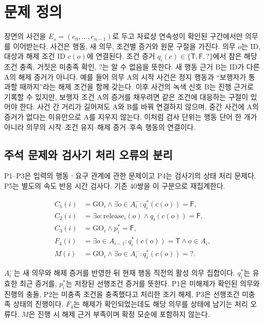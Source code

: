 \section{문제 정의}
\label{sec:problem}

\begin{revision}

장면의 사건을 $E_s=(e_0,\ldots,e_{n-1})$로 두고 자료상 연속성이 확인된 구간에서만 의무를 이어받는다. 사건은 행동, 새 의무, 조건별 증거와 원문 구절을 가진다. 의무 $o$는 ID, 대상과 해제 조건 ID $c(o)$에 연결된다. 조건 증거 $q_i(c)\in\{\mathsf{T},\mathsf{F},?\}$에서 참은 해당 조건 충족, 거짓은 미충족 확인, $?$는 알 수 없음을 뜻한다. 새 행동 근거 B는 ID가 다른 A의 해제 증거가 아니다.
예를 들어 의무 A의 시작 사건은 정지 행동과 ``보행자가 통과할 때까지''라는 해제 조건을 함께 갖는다. 이후 사건의 녹색 신호 B는 진행 근거로 기록할 수 있지만, 보행자 조건 A의 증거를 채우려면 같은 조건에 대응하는 구절이 있어야 한다. 사건 간 거리가 길어져도 A와 B를 바꿔 연결하지 않으며, 중간 사건에 A의 증거가 없다는 이유만으로 A를 지우지 않는다. 이처럼 검사 단위는 행동 단어 한 개가 아니라 의무의 시작--조건 유지--해제 증거--후속 행동의 연결이다.


\subsection{주석 문제와 검사기 처리 오류의 분리}
\label{sec:error-types}
P1--P3은 입력의 행동ㆍ요구 관계에 관한 문제이고 P4는 검사기의 상태 처리 문제다. P5는 별도의 속도 반응 시간 검사다. 기존 40쌍을 이 구분으로 재집계한다.

\begin{align}
C_1(i)&=\mathrm{GO}_i\land\exists o\in A_i^-:q_i^*(c(o))=\mathsf{F},\label{eq:hold-conflict}\\
C_2(i)&=\exists o:\mathrm{release}_i(o)\land q_i(c(o))=\mathsf{F},\\
C_3(i)&=\mathrm{GO}_i\land p_i^*=\mathsf{F},\\
F_4(i)&=\exists o\in A_{i-1}:q_i^*(c(o))=\mathsf{T}\land o\in A_i,\\
M(i)&=\mathrm{GO}_i\land\exists o\in A_i^-:q_i^*(c(o))=? .\label{eq:missing-evidence}
\end{align}

$A_i^-$는 새 의무와 해제 증거를 반영한 뒤 현재 행동 직전의 활성 의무 집합이다. $q_i^*$는 유효한 최근 증거를, $p_i^*$는 저장된 선행조건 증거를 뜻한다. P1은 미해제가 확인된 의무와 진행의 충돌, P2는 미충족 조건을 충족했다고 처리한 조기 해제, P3은 선행조건 미충족 상태의 진행이다. $F_4$는 해제가 확인되었는데도 해당 의무를 상태에 남기는 처리 오류다. $M$은 진행 시 해제 근거 부족이며 확정 모순에 포함하지 않는다.


\end{revision}
